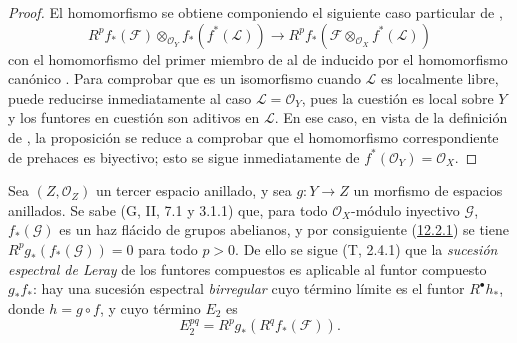 \begin{proof}
El homomorfismo  se obtiene componiendo el
siguiente caso particular de ,
\[
\label{0.12.2.3.2-fr}
\tag{12.2.3.2}
R^p f_*(\mathcal F)\otimes_{\mathcal O_Y}f_*(f^*(\mathcal L))
\longrightarrow
R^p f_*(\mathcal F\otimes_{\mathcal O_X}f^*(\mathcal L))
\]
con el homomorfismo del primer miembro de
 al de  inducido por el
homomorfismo canónico .
Para comprobar que  es un isomorfismo cuando $\mathcal L$ es
localmente libre, puede reducirse inmediatamente al caso
$\mathcal L=\mathcal O_Y$, pues la cuestión es local sobre $Y$ y los
funtores en cuestión son aditivos en $\mathcal L$.
En ese caso, en vista de la definición de , la
proposición se reduce a comprobar que el homomorfismo correspondiente
de prehaces es biyectivo; esto se sigue inmediatamente de
$f^*(\mathcal O_Y)=\mathcal O_X$.
\end{proof}

\begin{env}[12.2.4]
\label{0.12.2.4}
\label{0.12.2.4-fr}
Sea $(Z,\mathcal O_Z)$ un tercer espacio anillado, y sea
$g:Y\to Z$ un morfismo de espacios anillados.
Se sabe (G, II, 7.1 y 3.1.1) que, para todo
$\mathcal O_X$-módulo inyectivo $\mathcal G$, $f_*(\mathcal G)$ es un haz flácido de grupos abelianos, y por consiguiente (\hyperref[0.12.2.1-fr]{12.2.1}) se tiene $R^p g_*(f_*(\mathcal G))=0$ para todo $p>0$. De ello se sigue (T, 2.4.1) que la \emph{sucesión espectral de Leray} de los funtores compuestos es aplicable al funtor compuesto $g_*f_*$: hay una sucesión espectral \emph{birregular} cuyo término límite es el funtor $R^\bullet h_*$, donde $h=g\circ f$, y cuyo término $E_2$ es
\[
\label{0.12.2.4.1-fr}
\tag{12.2.4.1}
E_2^{pq}=R^p g_*(R^q f_*(\mathcal F)).
\]
\end{env}

